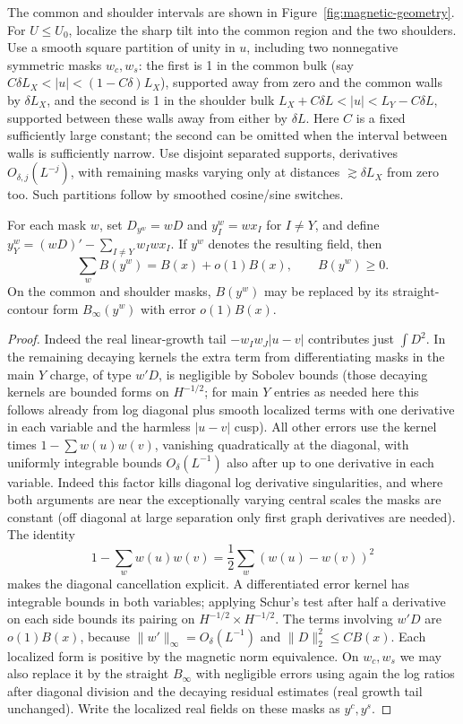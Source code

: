 The common and shoulder intervals are shown in Figure~\ref{fig:magnetic-geometry}.
For \(U\le U_0\), localize the sharp tilt into the common region and the two shoulders. Use a smooth square partition of unity in \(u\), including two nonnegative symmetric masks \(w_c,w_s\): the first is 1 in the common bulk (say \(C\delta L_X<|u|<(1-C\delta)L_X\)), supported away from zero and the common walls by \(\delta L_X\), and the second is 1 in the shoulder bulk \(L_X+C\delta L<|u|<L_Y-C\delta L\), supported between these walls away from either by \(\delta L\). Here \(C\) is a fixed sufficiently large constant; the second can be omitted when the interval between walls is sufficiently narrow. Use disjoint separated supports, derivatives \(O_{\delta,j}(L^{-j})\), with remaining masks varying only at distances \(\gtrsim\delta L_X\) from zero too. Such partitions follow by smoothed cosine/sine switches.


\begin{lemma}\label{lem:07_magnetic_analysis-localization}
For each mask \(w\), set \(D_{y^w}=wD\) and \(y_I^w=wx_I\) for \(I\ne Y\), and define \(y_Y^w=(wD)'-\sum_{I\ne Y}w_Iwx_I\). If \(y^w\) denotes the resulting field, then \[ \sum_w B(y^w)=B(x)+o(1)B(x),\qquad B(y^w)\ge0. \] On the common and shoulder masks, \(B(y^w)\) may be replaced by its straight-contour form \(B_\infty(y^w)\) with error \(o(1)B(x)\). 
\end{lemma}
\begin{proof}
Indeed the real linear-growth tail \(-w_Iw_J|u-v|\) contributes just \(\int D^2\). In the remaining decaying kernels the extra term from differentiating masks in the main \(Y\) charge, of type \(w' D\), is negligible by Sobolev bounds (those decaying kernels are bounded forms on \(H^{-1/2}\); for main \(Y\) entries as needed here this follows already from log diagonal plus smooth localized terms with one derivative in each variable and the harmless \(|u-v|\) cusp). All other errors use the kernel times \(1-\sum w(u)w(v)\), vanishing quadratically at the diagonal, with uniformly integrable bounds \(O_\delta(L^{-1})\) also after up to one derivative in each variable. Indeed this factor kills diagonal log derivative singularities, and where both arguments are near the exceptionally varying central scales the masks are constant (off diagonal at large separation only first graph derivatives are needed). The identity
\[
 1-\sum_w w(u)w(v)=\frac12\sum_w(w(u)-w(v))^2
\]
makes the diagonal cancellation explicit. A differentiated error kernel
has integrable bounds in both variables; applying Schur's test after
half a derivative on each side bounds its pairing on
\(H^{-1/2}\times H^{-1/2}\). The terms involving \(w'D\) are
\(o(1)B(x)\), because \(\|w'\|_\infty=O_\delta(L^{-1})\) and
\(\|D\|_2^2\le CB(x)\). Each localized form is positive by the
magnetic norm equivalence. On \(w_c,w_s\) we may also replace it by the straight \(B_\infty\) with negligible errors using again the log ratios after diagonal division and the decaying residual estimates (real growth tail unchanged). Write the localized real fields on these masks as \(y^c,y^s\).


\end{proof}

